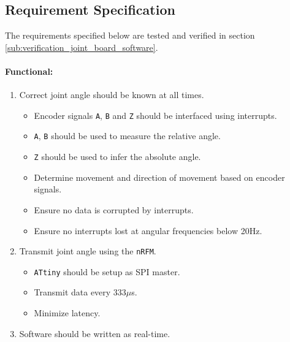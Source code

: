 \subsection{Requirement Specification} 
The requirements specified below are tested and verified in section \ref{sub:verification_joint_board_software}.
\paragraph{Functional:}
\begin{enumerate}[resume]
	\item Correct joint angle should be known at all times.
	\label{enum:joint_correct_angles}
	\begin{itemize}
		\item Encoder signals \texttt{A}, \texttt{B} and \texttt{Z} should be interfaced using interrupts.
		\item \texttt{A}, \texttt{B} should be used to measure the relative angle.
		\item \texttt{Z} should be used to infer the absolute angle. 
		\item Determine movement and direction of movement based on encoder signals.
		\item Ensure no data is corrupted by interrupts.
		\item Ensure no interrupts lost at angular frequencies below 20Hz.
	\end{itemize}
	\item Transmit joint angle using the \texttt{nRFM}.
	\label{enum:joint_transmit}
	\begin{itemize}
		\item \texttt{ATtiny} should be setup as SPI master.
		\item Transmit data every 333$\mu$s.
		\item Minimize latency.
	\end{itemize}
	\item Software should be written as real-time.
	\label{enum:joint_real_time}
\end{enumerate}

